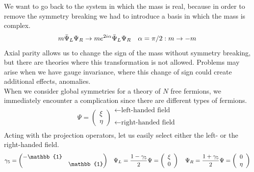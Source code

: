 \documentclass[../main.tex]{subfiles}
\begin{document}
We want to go back to the system in which the mass is real, because in order to remove the symmetry breaking we had to introduce a basis in which the mass is complex.
\[
m\Bar{\Psi}_L\Psi_R\to me^{2i\alpha}\Bar{\Psi}_L\Psi_R \quad \alpha=\pi/2: m\to-m
\]
Axial parity allows us to change the sign of the mass without symmetry breaking, but there are theories where this transformation is not allowed. Problems may arise when we have gauge invariance, where this change of sign could create additional effects, anomalies.\\
When we consider global symmetries for a theory of $N$ free fermions, we immediately encounter a complication since there are different types of fermions.
\[
\Psi=\left(\begin{array}{c}
     \xi \\
     \eta
\end{array}\right)
\begin{array}{c}
     \xleftarrow[]{}\text{left-handed field}\\
     \xleftarrow[]{}\text{right-handed field}
\end{array}
\]
Acting with the projection operators, let us easily select either the left- or the right-handed field.
\[
\gamma_5=\mqty(\dmat{-\mathbb{1},\mathbb{1}})
\quad
\Psi_L=\frac{1-\gamma_5}{2}\Psi=
\left(\begin{array}{c}
    \xi \\
     0
\end{array}\right)
\quad
\Psi_R=\frac{1+\gamma_5}{2}\Psi=
\left(\begin{array}{c}
     0 \\
     \eta
\end{array}\right)
\]
\end{document}
